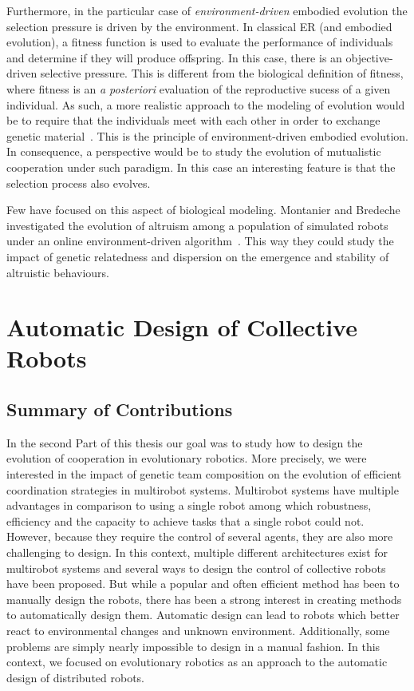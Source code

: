 			Furthermore, in the particular case of \emph{environment-driven} embodied evolution the selection pressure is driven by the environment. In classical ER (and embodied evolution), a fitness function is used to evaluate the performance of individuals and determine if they will produce offspring. In this case, there is an objective-driven selective pressure. This is different from the biological definition of fitness, where fitness is an \emph{a posteriori} evaluation of the reproductive sucess of a given individual. As such, a more realistic approach to the modeling of evolution would be to require that the individuals meet with each other in order to exchange genetic material~\parencite{Bredeche2010}. This is the principle of environment-driven embodied evolution. In consequence, a perspective would be to study the evolution of mutualistic cooperation under such paradigm. In this case an interesting feature is that the selection process also evolves.

			Few have focused on this aspect of biological modeling. Montanier and Bredeche investigated the evolution of altruism among a population of simulated robots under an online environment-driven algorithm~\parencite{Montanier2011, Montanier2013}. This way they could study the impact of genetic relatedness and dispersion on the emergence and stability of altruistic behaviours.


\section{Automatic Design of Collective Robots}

	\subsection{Summary of Contributions}

		In the second Part of this thesis our goal was to study how to design the evolution of cooperation in evolutionary robotics. More precisely, we were interested in the impact of genetic team composition on the evolution of efficient coordination strategies in multirobot systems. Multirobot systems have multiple advantages in comparison to using a single robot among which robustness, efficiency and the capacity to achieve tasks that a single robot could not. However, because they require the control of several agents, they are also more challenging to design. In this context, multiple different architectures exist for multirobot systems and several ways to design the control of collective robots have been proposed. But while a popular and often efficient method has been to manually design the robots, there has been a strong interest in creating methods to automatically design them. Automatic design can lead to robots which better react to environmental changes and unknown environment. Additionally, some problems are simply nearly impossible to design in a manual fashion. In this context, we focused on evolutionary robotics as an approach to the automatic design of distributed robots.

